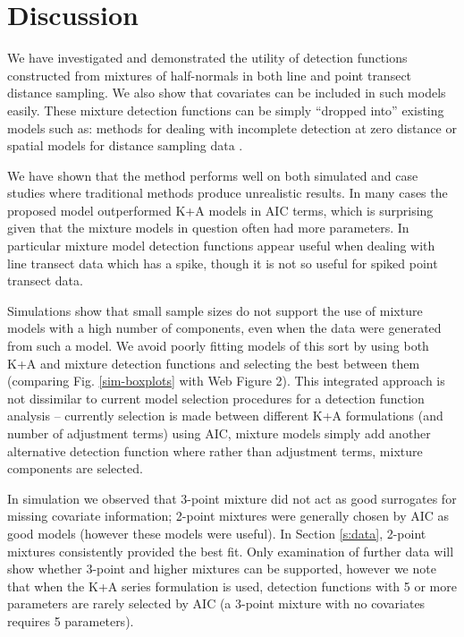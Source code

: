 \documentclass[useAMS,referee,usenatbib]{biom}
\begin{document}
\section{Discussion}
\label{s:discuss}

We have investigated and demonstrated the utility of detection functions constructed from mixtures of half-normals in both line and point transect distance sampling. We also show that covariates can be included in such models easily. These mixture detection functions can be simply ``dropped into'' existing models such as: methods for dealing with incomplete detection at zero distance \citep{Laake:2004tz, Laake:2011vm} or spatial models for distance sampling data \citep{Hedley:2004et, Miller:2013us}.

We have shown that the method performs well on both simulated and case studies where traditional methods produce unrealistic results. In many cases the proposed model outperformed K+A models in AIC terms, which is surprising given that the mixture models in question often had more parameters. In particular mixture model detection functions appear useful when dealing with line transect data which has a spike, though it is not so useful for spiked point transect data.

Simulations show that small sample sizes do not support the use of mixture models with a high number of components, even when the data were generated from such a model. We avoid poorly fitting models of this sort by using both K+A and mixture detection functions and selecting the best between them (comparing Fig. \ref{sim-boxplots} with Web Figure 2). This integrated approach is not dissimilar to current model selection procedures for a detection function analysis -- currently selection is made between different K+A formulations (and number of adjustment terms) using AIC, mixture models simply add another alternative detection function where rather than adjustment terms, mixture components are selected.

In simulation we observed that 3-point mixture did not act as good surrogates for missing covariate information; 2-point mixtures were generally chosen by AIC as good models (however these models were useful). In Section \ref{s:data}, 2-point mixtures consistently provided the best fit. Only examination of further data will show whether 3-point and higher mixtures can be supported, however we note that when the K+A series formulation is used, detection functions with 5 or more parameters are rarely selected by AIC (a 3-point mixture with no covariates requires 5 parameters).
\end{document}
